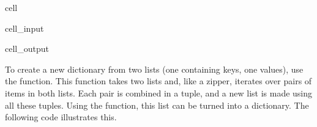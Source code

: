 \documentclass[letterpaper,10pt,english]{jupyterBook}
\begin{document}
\begin{sphinxuseclass}{cell}\begin{sphinxVerbatimInput}

\begin{sphinxuseclass}{cell_input}
\begin{sphinxVerbatim}[commandchars=\\\{\}]
       
\end{sphinxVerbatim}

\end{sphinxuseclass}\end{sphinxVerbatimInput}
\begin{sphinxVerbatimOutput}

\begin{sphinxuseclass}{cell_output}
\begin{sphinxVerbatim}
\end{sphinxVerbatim}

\end{sphinxuseclass}\end{sphinxVerbatimOutput}

\end{sphinxuseclass}
\sphinxAtStartPar
To create a new dictionary from two lists (one containing keys, one values), use the  function. This function takes two lists and, like a zipper, iterates over pairs of items in both lists. Each pair is combined in a tuple, and a new list is made using all these tuples. Using the  function, this list can be turned into a dictionary. The following code illustrates this.
\end{document}
